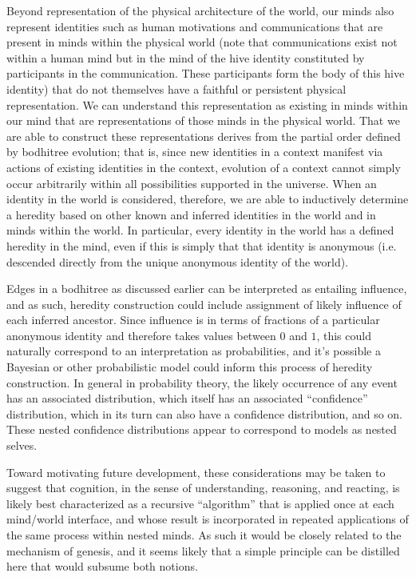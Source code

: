 \documentclass[pra,twocolumn,groupedaddress,10pt]{revtex4}
\theoremstyle{definition}
\begin{document}
Beyond representation of the physical architecture of the world, our minds also represent identities such as human motivations and communications that are present in minds within the physical world (note that communications exist not within a human mind but in the mind of the hive identity constituted by participants in the communication. These participants form the body of this hive identity) that do not themselves have a faithful or persistent physical representation. We can understand this representation as existing in minds within our mind that are representations of those minds in the physical world. That we are able to construct these representations derives from the partial order defined by bodhitree evolution; that is, since new identities in a context manifest via actions of existing identities in the context, evolution of a context cannot simply occur arbitrarily within all possibilities supported in the universe. When an identity in the world is considered, therefore, we are able to inductively determine a heredity based on other known and inferred identities in the world and in minds within the world. In particular, every identity in the world has a defined heredity in the mind, even if this is simply that that identity is anonymous (i.e. descended directly from the unique anonymous identity of the world).

Edges in a bodhitree as discussed earlier can be interpreted as entailing influence, and as such, heredity construction could include assignment of likely influence of each inferred ancestor. Since influence is in terms of fractions of a particular anonymous identity and therefore takes values between $0$ and $1$, this could naturally correspond to an interpretation as probabilities, and it's possible a Bayesian or other probabilistic model could inform this process of heredity construction. In general in probability theory, the likely occurrence of any event has an associated distribution, which itself has an associated ``confidence'' distribution, which in its turn can also have a confidence distribution, and so on. These nested confidence distributions appear to correspond to models as nested selves.

Toward motivating future development, these considerations may be taken to suggest that cognition, in the sense of understanding, reasoning, and reacting, is likely best characterized as a recursive ``algorithm'' that is applied once at each mind/world interface, and whose result is incorporated in repeated applications of the same process within nested minds. As such it would be closely related to the mechanism of genesis, and it seems likely that a simple principle can be distilled here that would subsume both notions.
\end{document}
